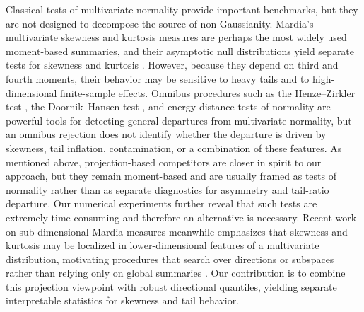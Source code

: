 \documentclass[11pt]{article}
\theoremstyle{plain}
\theoremstyle{definition}
\theoremstyle{remark}
\begin{document}
Classical tests of multivariate normality provide important benchmarks, but they are not designed to decompose the source of non-Gaussianity. Mardia's multivariate skewness and kurtosis measures are perhaps the most widely used moment-based summaries, and their asymptotic null distributions yield separate tests for skewness and kurtosis \citep{mardia1970measures, mardia1974applications}.  However, because they depend on third and fourth moments, their behavior may be sensitive to heavy tails and to high-dimensional finite-sample effects.  Omnibus procedures such as the Henze--Zirkler test \citep{henze1990class}, the Doornik--Hansen test \citep{doornik2008omnibus}, and energy-distance tests of normality \citep{szekely2013energy, szekely2017energy} are powerful tools for detecting general departures from multivariate normality, but an omnibus rejection does not identify whether the departure is driven by skewness, tail inflation, contamination, or a combination of these features. As mentioned above, projection-based competitors are closer in spirit to our approach, but they remain moment-based and are usually framed as tests of normality rather than as separate diagnostics for asymmetry and tail-ratio departure. Our numerical experiments further reveal that such tests are extremely time-consuming and therefore an alternative is necessary. Recent work on sub-dimensional Mardia measures meanwhile emphasizes that skewness and kurtosis may be localized in lower-dimensional features of a multivariate distribution, motivating procedures that search over directions or subspaces rather than relying only on global summaries \citep{chowdhury2022sub}.  Our contribution is to combine this projection viewpoint with robust directional quantiles, yielding separate interpretable statistics for skewness and tail behavior.
\end{document}
